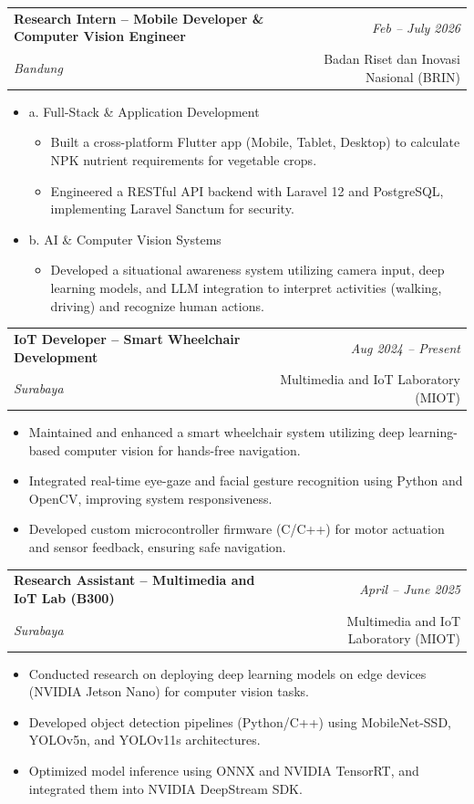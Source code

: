 \documentclass[a4paper,11pt]{article}
\makeatletter
\newcommand{\resumeSubheading}[4]{
\vspace{0.5mm}\item
    \begin{tabular*}{0.98\textwidth}[t]{l@{\extracolsep{\fill}}r}
        \textbf{#1} & \textit{\footnotesize{#4}} \\
        \textit{\footnotesize{#3}} &  \footnotesize{#2}\\
    \end{tabular*}
    \vspace{-2.4mm}
}
\newcommand{\resumeItemListStart}{\begin{justify}\begin{itemize}[leftmargin=3ex, rightmargin=2ex, noitemsep,labelsep=1.2mm,itemsep=0mm]\small}
\newcommand{\resumeItemListEnd}{\end{itemize}\end{justify}\vspace{-2mm}}
\makeatother
\begin{document}
\resumeSubheading
{Research Intern -- Mobile Developer \& Computer Vision Engineer}{Badan Riset dan Inovasi Nasional (BRIN)}
{Bandung}{Feb -- July 2026}
\vspace{0mm}
\begin{itemize}[leftmargin=1.5ex, label={}]
\item{a. Full-Stack \& Application Development}
    \begin{itemize}[label=-]
        \item {Built a cross-platform Flutter app (Mobile, Tablet, Desktop) to calculate NPK nutrient requirements for vegetable crops.}
        \item {Engineered a RESTful API backend with Laravel 12 and PostgreSQL, implementing Laravel Sanctum for security.}
    \end{itemize}
\item{b. AI \& Computer Vision Systems}
    \begin{itemize}[label=-]
        \item {Developed a situational awareness system utilizing camera input, deep learning models, and LLM integration to interpret activities (walking, driving) and recognize human actions.}
    \end{itemize}
\end{itemize}

\vspace{-2mm}
\resumeSubheading
{IoT Developer -- Smart Wheelchair Development}{Multimedia and IoT Laboratory (MIOT)}
{Surabaya}{Aug 2024 -- Present}
\resumeItemListStart
\item {Maintained and enhanced a smart wheelchair system utilizing deep learning-based computer vision for hands-free navigation.}
\item {Integrated real-time eye-gaze and facial gesture recognition using Python and OpenCV, improving system responsiveness.}
\item {Developed custom microcontroller firmware (C/C++) for motor actuation and sensor feedback, ensuring safe navigation.}
\resumeItemListEnd

\vspace{-2mm}
\resumeSubheading
{Research Assistant -- Multimedia and IoT Lab (B300)}{Multimedia and IoT Laboratory (MIOT)}
{Surabaya}{April -- June 2025}
\resumeItemListStart
\item {Conducted research on deploying deep learning models on edge devices (NVIDIA Jetson Nano) for computer vision tasks.}
\item {Developed object detection pipelines (Python/C++) using MobileNet-SSD, YOLOv5n, and YOLOv11s architectures.}
\item {Optimized model inference using ONNX and NVIDIA TensorRT, and integrated them into NVIDIA DeepStream SDK.}
\resumeItemListEnd
\end{document}
